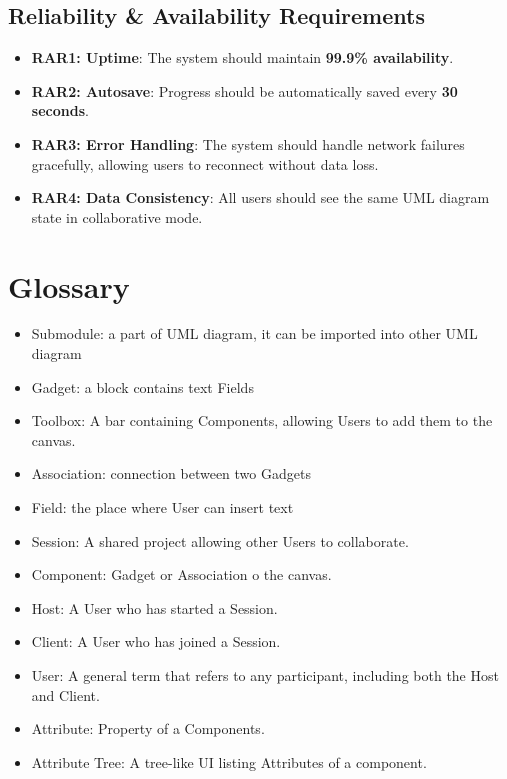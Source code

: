 \documentclass[12pt]{article}
\begin{document}
    \subsection{Reliability \& Availability Requirements}
    \begin{itemize}
        \item \textbf{RAR1: Uptime}: The system should maintain \textbf{99.9\% availability}.
        \item \textbf{RAR2: Autosave}: Progress should be automatically saved every \textbf{30 seconds}.
        \item \textbf{RAR3: Error Handling}: The system should handle network failures gracefully, allowing users to reconnect without data loss.
        \item \textbf{RAR4: Data Consistency}: All users should see the same UML diagram state in collaborative mode.
    \end{itemize}


    \section{Glossary}
    \begin{itemize}
        \item Submodule: a part of UML diagram, it can be imported into other UML diagram
        \item Gadget: a block contains text Fields
        \item Toolbox: A bar containing Components, allowing Users to add them to the canvas.
        \item Association: connection between two Gadgets
        \item Field: the place where User can insert text
        \item Session: A shared project allowing other Users to collaborate.
        \item Component: Gadget or Association o the canvas.
        \item Host: A User who has started a Session.
        \item Client: A User who has joined a Session.
        \item User: A general term that refers to any participant, including both the Host and Client.
        \item Attribute: Property of a Components.
        \item Attribute Tree: A tree-like UI listing Attributes of a component.
    \end{itemize}
\end{document}
